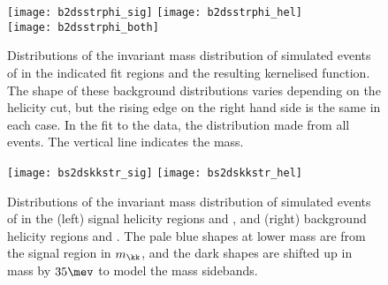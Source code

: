 \begin{figure}
  \begin{center}
    \texttt{[image: b2dsstrphi\_sig]}
    \texttt{[image: b2dsstrphi\_hel]}\\
    \texttt{[image: b2dsstrphi\_both]}
    \caption[Contribution to the \btodsphi fit from the \btodsstrphi background]
    {
      Distributions of the invariant mass distribution of simulated events of \btodsstrphi
      in the indicated fit regions and the resulting kernelised function.
      The shape of these background distributions varies depending on the helicity cut, but the
      rising edge on the right hand side is the same in each case.
      In the fit to the data, the distribution made from all events.
      The vertical line indicates the \Bp mass.
    }
    \label{fig:dsphi:dsstrphi}
  \end{center}
\end{figure}







\begin{figure}
  \begin{center}
    \texttt{[image: bs2dskkstr\_sig]}
    \texttt{[image: bs2dskkstr\_hel]}
    \caption[Shapes of the \bstodskstrk background]
    {
      Distributions of the invariant mass distribution of simulated events of \bstodskstrk in the
      (left) signal helicity regions \rA and \rB, and
      (right) background helicity regions \rC and \rD.
      The pale blue shapes at lower mass are from the signal region in $m_\kk$, and the dark
      shapes are shifted up in mass by $35\mev$ to model the \phii mass sidebands.
    }
    \label{fig:dsphi:bstodskstrk}
  \end{center}
\end{figure}

